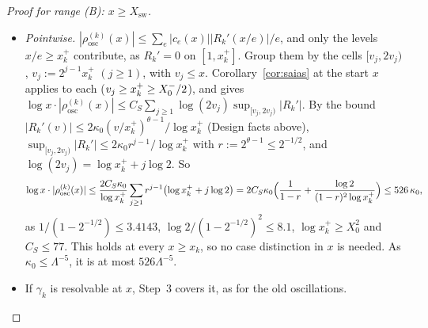 \begin{proof}[Proof for range \textup{(B)}: $x\ge X_{\mathrm{sw}}$]
\begin{itemize}
\item \emph{Pointwise.} $|\rho^{(k)}_{\mathrm{osc}}(x)|\le\sum_e|c_e(x)||R_k'(x/e)|/e$, and only the levels $x/e\ge x_k^+$
  contribute, as $R_k'=0$ on $[1,x_k^+]$. Group them by the cells $[v_j,2v_j)$, $v_j:=2^{j-1}x_k^+$ $(j\ge1)$, with $v_j\le x$.
  Corollary~\ref{cor:saias} at the start $x$ applies to each ($v_j\ge x_k^+\ge X_0^{-}/2$), and gives
  $\log x\cdot|\rho^{(k)}_{\mathrm{osc}}(x)|\le C_S\sum_{j\ge1}\log(2v_j)\sup_{[v_j,2v_j)}|R_k'|$. By the bound
  $|R_k'(v)|\le2\kappa_0(v/x_k^+)^{\theta-1}/\log x_k^+$ (Design facts above),
  $\sup_{[v_j,2v_j)}|R_k'|\le2\kappa_0r^{j-1}/\log x_k^+$ with $r:=2^{\theta-1}\le2^{-1/2}$, and $\log(2v_j)=\log x_k^+ + j\log2$. So
  \[
    \log x\cdot|\rho^{(k)}_{\mathrm{osc}}(x)|\le\frac{2C_S\kappa_0}{\log x_k^+}\sum_{j\ge1}r^{j-1}\bigl(\log x_k^++j\log2\bigr)
    =2C_S\kappa_0\Bigl(\frac1{1-r}+\frac{\log2}{(1-r)^2\log x_k^+}\Bigr)\le526\,\kappa_0,
  \]
  as $1/(1-2^{-1/2})\le3.4143$, $\log2/(1-2^{-1/2})^2\le8.1$, $\log x_k^+\ge X_0^2$ and $C_S\le77$. This holds at every $x\ge x_k$,
  so no case distinction in $x$ is needed. As $\kappa_0\le\Lambda^{-5}$, it is at most $526\Lambda^{-5}$.
\item If $\gamma_k$ is resolvable at $x$, Step~3 covers it, as for the old oscillations.
\end{itemize}


\end{proof}
